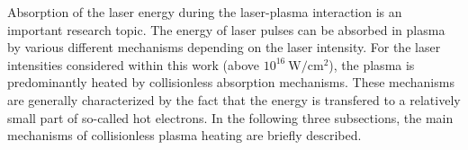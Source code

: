 Absorption of the laser energy during the laser-plasma interaction is an important research topic. The energy of laser pulses can be absorbed in plasma by various different mechanisms depending on the laser intensity. For the laser intensities considered within this work (above $ 10^{16} \ \mathrm{W/cm^2} $), the plasma is predominantly heated by collisionless absorption mechanisms. These mechanisms are generally characterized by the fact that the energy is transfered to a relatively small part of so-called hot electrons. In the following three subsections, the main mechanisms of collisionless plasma heating are briefly described.

